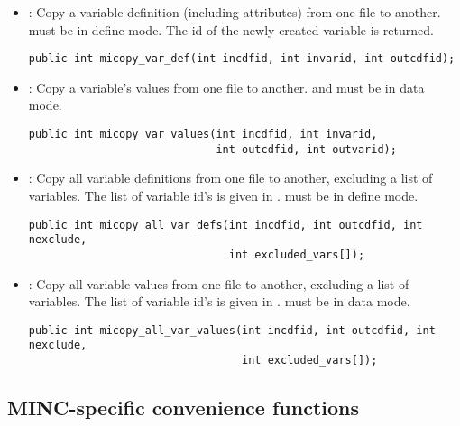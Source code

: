 \begin{itemize}
\item {} : Copy a variable definition (including
attributes) from one file to another.  must be in
define mode. The id of the newly created variable is returned.
\begin{verbatim}
public int micopy_var_def(int incdfid, int invarid, int outcdfid);
\end{verbatim}

\item {} : Copy a variable's values from one
file to another.  and  must be in data
mode.
\begin{verbatim}
public int micopy_var_values(int incdfid, int invarid, 
                             int outcdfid, int outvarid);
\end{verbatim}

\item {} : Copy all variable definitions from
one file to another, excluding a list of variables. The list of
 variable id's is given in .
 must be in define mode.
\begin{verbatim}
public int micopy_all_var_defs(int incdfid, int outcdfid, int nexclude,
                               int excluded_vars[]);
\end{verbatim}

\item {} : Copy all variable values from one
file to another, excluding a list of variables.  The list of
 variable id's is given in .
 must be in data mode.
\begin{verbatim}
public int micopy_all_var_values(int incdfid, int outcdfid, int nexclude,
                                 int excluded_vars[]);
\end{verbatim}

\end{itemize}

\subsection{MINC-specific convenience functions}

